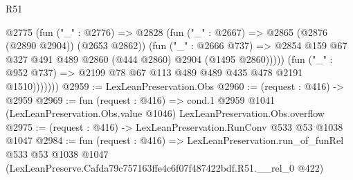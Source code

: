 \begin{lexlean}{R51}
\begin{coremodule}
                  @2775
                    (fun ("_" : @2776) =>
                    @2828
                      (fun ("_" : @2667) => @2865 (@2876 (@2890 @2904)) (@2653 @2862))
                      (fun ("_" : @2666 @737) =>
                      @2854 @159 @67 @327 @491 @489 @2860 (@444 @2860) @2904 (@1495 @2860)))))
                (fun ("_" : @952 @737) => @2199 @78 @67 @113 @489 @489 @435 @478 @2191 @1510)))))))
@2959 := LexLeanPreservation.Obs
@2960 := (request : @416) -> @2959
@2969 := fun (request : @416) =>
  cond.{1} @2959 @1041 (LexLeanPreservation.Obs.value @1046) LexLeanPreservation.Obs.overflow
@2975 := (request : @416) -> LexLeanPreservation.RunConv @533 @53 @1038 @1047
@2984 := fun (request : @416) =>
  LexLeanPreservation.run_of_funRel
    @533
    @53
    @1038
    @1047
    (LexLeanPreserve.Cafda79c757163ffe4c6f07f487422bdf.R51.__rel_0 @422)
\end{coremodule}
\end{lexlean}
